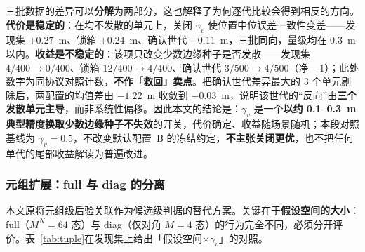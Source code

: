 \documentclass[UTF8,a4paper,zihao=-4]{ctexart}
\begin{document}
三批数据的差异可以\textbf{分解}为两部分，这也解释了为何逐代比较会得到相反的方向。\textbf{代价是稳定的}：在均不发散的单元上，关闭 $\gamma_v$ 使位置中位误差一致性变差——发现集 $+0.27$~m、锁箱 $+0.24$~m、确认世代 $+0.11$~m，三批同向，量级均在 0.3~m 以内。\textbf{收益是不稳定的}：该项只改变少数边缘种子是否发散——发现集 $4/400\to0/400$、锁箱 $12/400\to4/400$、确认世代 $3/500\to4/500$（净 $-1$）；此处数字为同协议对照计数，\textbf{不作「救回」卖点}。把确认世代差异最大的 3 个单元剔除后，两配置的均值差由 $-1.22$~m 收敛到 $-0.03$~m，说明该世代的“反向”由\textbf{三个发散单元主导}，而非系统性偏移。因此本文的结论是：$\gamma_v$ 是一个\textbf{以约 0.1--0.3~m 典型精度换取少数边缘种子不失效}的开关，代价确定、收益随场景随机；本段对照基线为 $\gamma_v=0.5$，不改变默认配置~B 的冻结约定，\textbf{不主张关闭更优}，也不把任何单代的尾部收益解读为普遍改进。

\subsubsection{元组扩展：full 与 diag 的分离}\label{sec:tuple-results}

本文原将元组级后验关联作为候选级判据的替代方案。关键在于\textbf{假设空间的大小}：full（$M^N=64$ 态）与 diag（仅对角 $M=4$ 态）的行为完全不同，必须分开评价。表~\ref{tab:tuple}在发现集上给出「假设空间$\times\gamma_v$」的对照。

\begin{table}[htbp]
\centering
\caption{候选级判据在同一批种子上的对照（随机几何 MC=300--399，100 个实现；位置 RMSE，m；发散判据 \(>50\)~m）}\label{tab:tuple}
\small
{}
\end{table}
\end{document}
